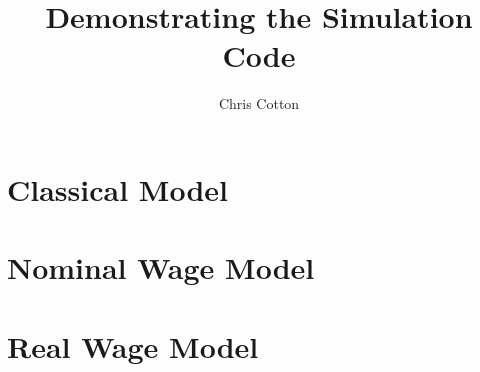 \documentclass{article}
\begin{document}
\title{Demonstrating the Simulation Code}
\author{Chris Cotton}
\maketitle

\newpage
\section{Classical Model}


\newpage

\section{Nominal Wage Model}


\newpage

\section{Real Wage Model}






% 
\end{document}
